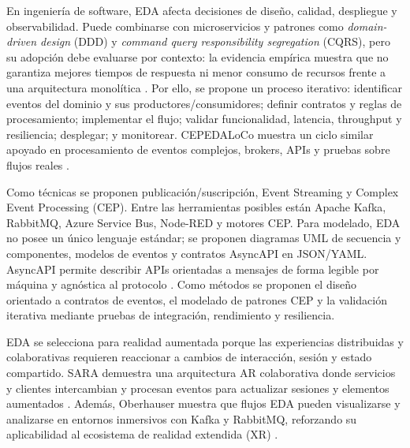 \documentclass[conference]{IEEEtran}
\begin{document}
En ingeniería de software, EDA afecta decisiones de diseño, calidad, despliegue y observabilidad. Puede combinarse con microservicios y patrones como \textit{domain-driven design} (DDD) y \textit{command query responsibility segregation} (CQRS), pero su adopción debe evaluarse por contexto: la evidencia empírica muestra que no garantiza mejores tiempos de respuesta ni menor consumo de recursos frente a una arquitectura monolítica \cite{Cabane2024}. Por ello, se propone un proceso iterativo: identificar eventos del dominio y sus productores/consumidores; definir contratos y reglas de procesamiento; implementar el flujo; validar funcionalidad, latencia, throughput y resiliencia; desplegar; y monitorear. CEPEDALoCo muestra un ciclo similar apoyado en procesamiento de eventos complejos, brokers, APIs y pruebas sobre flujos reales \cite{RosaBilbao2023}.

Como técnicas se proponen publicación/suscripción, Event Streaming y Complex Event Processing (CEP). Entre las herramientas posibles están Apache Kafka, RabbitMQ, Azure Service Bus, Node-RED y motores CEP. Para modelado, EDA no posee un único lenguaje estándar; se proponen diagramas UML de secuencia y componentes, modelos de eventos y contratos AsyncAPI en JSON/YAML. AsyncAPI permite describir APIs orientadas a mensajes de forma legible por máquina y agnóstica al protocolo \cite{AsyncAPI}. Como métodos se proponen el diseño orientado a contratos de eventos, el modelado de patrones CEP y la validación iterativa mediante pruebas de integración, rendimiento y resiliencia.

EDA se selecciona para realidad aumentada porque las experiencias distribuidas y colaborativas requieren reaccionar a cambios de interacción, sesión y estado compartido. SARA demuestra una arquitectura AR colaborativa donde servicios y clientes intercambian y procesan eventos para actualizar sesiones y elementos aumentados \cite{Vaquero2020}. Además, Oberhauser muestra que flujos EDA pueden visualizarse y analizarse en entornos inmersivos con Kafka y RabbitMQ, reforzando su aplicabilidad al ecosistema de realidad extendida (XR) \cite{Oberhauser2023}.
\end{document}
